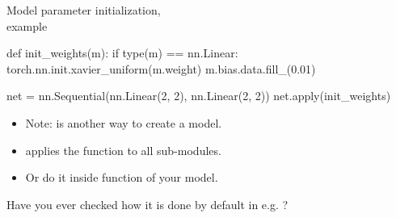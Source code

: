 \begin{frame}[fragile]{Model parameter initialization,\\ example}
\begin{python}
def init_weights(m):
    if type(m) == nn.Linear:
        torch.nn.init.xavier_uniform(m.weight)
        m.bias.data.fill_(0.01)

net = nn.Sequential(nn.Linear(2, 2), nn.Linear(2, 2))
net.apply(init_weights)
\end{python}
\vsp
\begin{itemize}
\item Note:  is another way to create a model. 
\item {} applies the function to all sub-modules.
\item Or do it inside  function of your model.
\end{itemize}
\vsp
\vsp

Have you ever checked how it is done by default in e.g. ?
\end{frame}

